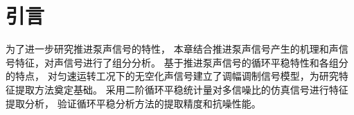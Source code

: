 \section{引言}
为了进一步研究推进泵声信号的特性，
本章结合推进泵声信号产生的机理和声信号特征，对声信号进行了组分分析。
基于推进泵声信号的循环平稳特性和各组分的特点，
对匀速运转工况下的无空化声信号建立了调幅调制信号模型，为研究特征提取方法奠定基础。
采用二阶循环平稳统计量对多信噪比的仿真信号进行特征提取分析，
验证循环平稳分析方法的提取精度和抗噪性能。
\begin{comment}
推进泵噪声按声源类型的不同，可以将推进泵噪声分为流致噪声和振动噪声，其中流致噪声是推进泵噪声的主要贡献者。
流致噪声是由泵内非定常流动与泵相互作用产生的非定常流致激励所引起的，
前期研究发现，推进泵叶轮与其他部件之间的动静干涉是重要的流致噪声激励源。
动静干涉是指由于推进泵转子（如叶轮）和静止部件（如导叶和导管）之间的周
向不均匀流动在旋转过程中相互作用，从而导致了泵内部流道中复杂的非定常流动现象。
因此，推进泵噪声是推进泵流致激励特性的最直接的外在表现，
构建推进泵流致激励源特征提取的有效方法和途径，从声信号中分析出流致激励源
的影响程度以及两者的作用机理，对于推进泵低噪声设计及发展噪声能量主动控制技术至关重要。

第三章推进泵噪声试验结果显示，监测到的推进泵噪声频谱特性表现为中低频线谱噪声，中低频宽带谱噪声和
高频宽带谱噪声。
声信号中蕴含着丰富的流致激励源信息，但是难以从声信号频谱中提取出流致激励源特征信号，信号中存在复杂的干扰因素：
其一，推进泵处在复杂的背景环境声场中，背景声场中存在复杂的干扰
成分，影响测试系统对推进泵目标真实辐射声信号的监测；其二，推进泵结构复杂，
由于具有周期性分布的旋转、静止构件和导管，
辐射噪声的声源构件并不单一，其辐射噪声具有分量复杂性。
基于上述干扰因素，监测系统接收到的目标声场信号的
信噪比较低，特征信号如动静干涉频率、轴频等与其他背景噪声相比均较为微弱，给基于传统噪声特征提取方法带来了困难，
难以准确的获得推进泵的工作状态和结构信息，也给流致激励源特征的提取带来很大的难度。

其次，推进泵流致噪声存在显著的调制现象，上章节所研究的推进泵噪声频谱已呈现出较强的调制特性，
调制现象也是流致激励作用的结果，其中蕴含着丰富的流致激励源信息，
但是传统的频谱分析及解调方法无法实现高精度低频调制特征的提取。
因此，针对推进泵声信号的特点，开展对其声信号的分量分析研究，
基于其信号的循环平稳特性，
建立流致激励源-声信号模型，
探索合适的流致激励源特征提取方法，对噪声的机理分析和流致激励源特征提取有重要意义。
\end{comment}

